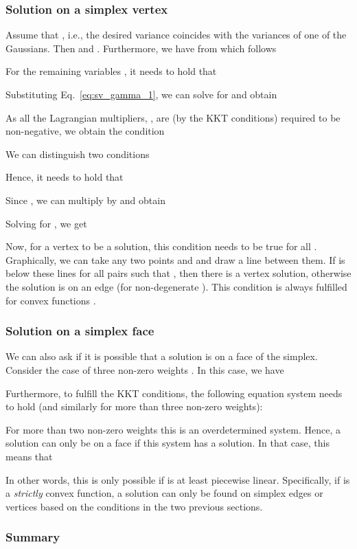 \documentclass{article}
\numberwithin{equation}{section}
\newcommand{\ie}{{i.e.}}
\begin{document}
\subsubsection{Solution on a simplex vertex}

Assume that , \ie, the desired variance coincides with the variances of one of the Gaussians. Then  and . Furthermore, we have  from which follows

For the remaining  variables , it needs to hold that

Substituting Eq.~\eqref{eq:sv_gamma_1}, we can solve for  and obtain

As all the Lagrangian multipliers, , are (by the KKT conditions) required to be non-negative, we obtain the condition

We can distinguish two conditions

Hence, it needs to hold that

Since , we can multiply by  and obtain

Solving for , we get

Now, for a vertex  to be a solution, this condition needs to be true for all . Graphically, we can take any two points  and  and draw a line between them. If  is below these lines for all pairs  such that , then there is a vertex solution, otherwise the solution is on an edge (for non-degenerate ). This condition is always fulfilled for convex functions .

\subsubsection{Solution on a simplex face}

We can also ask if it is possible that a solution is on a face of the simplex. Consider the case of three non-zero weights . In this case, we have

Furthermore, to fulfill the KKT conditions, the following equation system needs to hold (and similarly for more than three non-zero weights):

For more than two non-zero weights this is an overdetermined system. Hence, a solution can only be on a face if this system has a solution. In that case, this means that

In other words, this is only possible if  is at least piecewise linear. Specifically, if  is a {\it strictly} convex function, a solution can only be found on simplex edges or vertices based on the conditions in the two previous sections.

\subsubsection{Summary}
\label{subsec:lp_summary}
\end{document}
